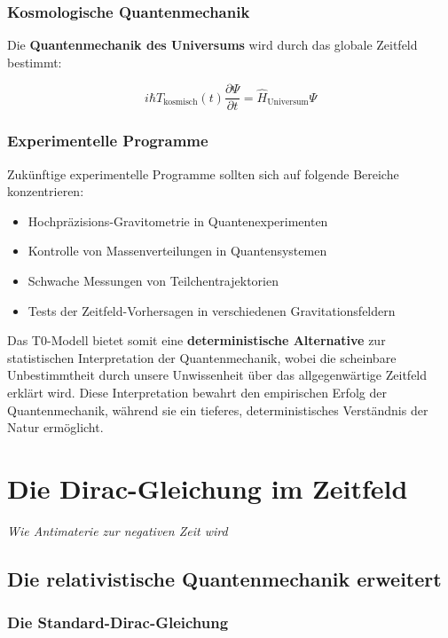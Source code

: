 \documentclass[12pt,a4paper]{report}
\begin{document}
	\subsection{Kosmologische Quantenmechanik}
	
	Die \textbf{Quantenmechanik des Universums} wird durch das globale Zeitfeld bestimmt:
	
	\begin{equation}
		i\hbar T_{\text{kosmisch}}(t)\frac{\partial\Psi}{\partial t} = \hat{H}_{\text{Universum}}\Psi
	\end{equation}
	
	\subsection{Experimentelle Programme}
	
	Zukünftige experimentelle Programme sollten sich auf folgende Bereiche konzentrieren:
	\begin{itemize}
		\item Hochpräzisions-Gravitometrie in Quantenexperimenten
		\item Kontrolle von Massenverteilungen in Quantensystemen
		\item Schwache Messungen von Teilchentrajektorien
		\item Tests der Zeitfeld-Vorhersagen in verschiedenen Gravitationsfeldern
	\end{itemize}
	
	Das T0-Modell bietet somit eine \textbf{deterministische Alternative} zur statistischen Interpretation der Quantenmechanik, wobei die scheinbare Unbestimmtheit durch unsere Unwissenheit über das allgegenwärtige Zeitfeld erklärt wird. Diese Interpretation bewahrt den empirischen Erfolg der Quantenmechanik, während sie ein tieferes, deterministisches Verständnis der Natur ermöglicht.
	\chapter{Die Dirac-Gleichung im Zeitfeld}
	\textit{Wie Antimaterie zur negativen Zeit wird}
	
	\section{Die relativistische Quantenmechanik erweitert}
	
	\subsection{Die Standard-Dirac-Gleichung}
	
\end{document}
